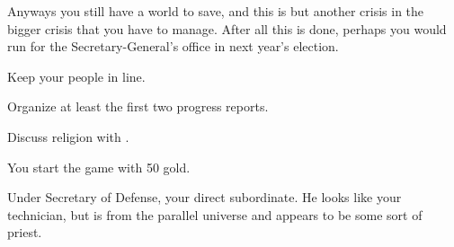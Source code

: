 \documentclass[char]{guildcamp3}
\begin{document}
Anyways you still have a world to save, and this is but another crisis in the bigger crisis that you have to manage. After all this is done, perhaps you would run for the Secretary-General's office in next year's election.

\begin{itemz}[Goals]
  \item Keep your people in line.
  \item Organize at least the first two progress reports.
  \item Discuss religion with \cPaladin{}.
\end{itemz}

\begin{itemz}[Notes]
	\item You start the game with 50 gold. 
	\end{itemz}
\begin{contacts}
  \contact{\cPoliOne{}} Under Secretary of Defense, your direct subordinate.
  \contact{\cPaladin{}} He looks like your technician, but is from the parallel universe and appears to be some sort of priest.
\end{contacts}
\end{document}
